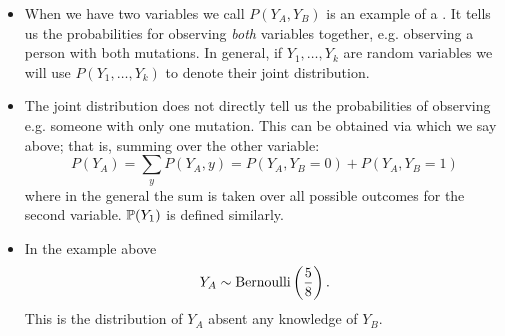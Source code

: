 \begin{itemize}
\begin{example}
\end{example}
\item When we have two variables we call $P(Y_A,Y_B)$ is an example of a . It tells us the probabilities for observing \emph{both} variables together, e.g. observing a person with both mutations. In general, if $Y_1,\dots,Y_k$ are random variables we will use $P(Y_1,\dots,Y_k)$ to denote their joint distribution.
\item The joint distribution does not directly tell us the probabilities of observing e.g. someone with only one mutation. This can be obtained via  which we say above; that is, summing over the other variable:
\begin{equation}
P(Y_A)  = \sum_{y}P(Y_A,y) = P(Y_A,Y_B = 0)  +P(Y_A,Y_B= 1)
\end{equation}
where in the general the sum is taken over all possible outcomes for the second variable. $\mathbb P(Y_1)$ is defined similarly. 
\item In the example above 
\begin{equation}
Y_A \sim {\rm Bernoulli}\left(\frac{5}{8}\right).
\end{equation}
This is the distribution of $Y_A$ absent any knowledge of $Y_B$. 
\end{itemize}




